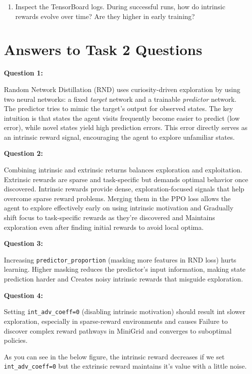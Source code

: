 \documentclass[12pt]{article}
\begin{document}
{{{\begin{itemize}[noitemsep]
\begin{enumerate}
    \item Inspect the TensorBoard logs. During successful runs, how do intrinsic rewards evolve over time? Are they higher in early training?
\end{enumerate}
\end{itemize}

\section*{Answers to Task 2 Questions}

\textbf{Question 1:} 

Random Network Distillation (RND) uses curiosity-driven exploration by using two neural networks: a fixed \textit{target} network and a trainable \textit{predictor} network. The predictor tries to mimic the target's output for observed states. The key intuition is that states the agent visits frequently become easier to predict (low error), while novel states yield high prediction errors. This error directly serves as an intrinsic reward signal, encouraging the agent to explore unfamiliar states.

\textbf{Question 2:} 

Combining intrinsic and extrinsic returns balances exploration and exploitation. Extrinsic rewards are sparse and task-specific but demands optimal behavior once discovered. Intrinsic rewards provide dense, exploration-focused signals that help overcome sparse reward problems. Merging them in the PPO loss allows the agent to explore effectively early on using intrinsic motivation and Gradually shift focus to task-specific rewards as they're discovered and Maintains exploration even after finding initial rewards to avoid local optima.

\textbf{Question 3:} 

Increasing \texttt{predictor\_proportion} (masking more features in RND loss) hurts learning. Higher masking reduces the predictor's input information, making state prediction harder and Creates noisy intrinsic rewards that misguide exploration.

\textbf{Question 4:} 

Setting \texttt{int\_adv\_coeff=0} (disabling intrinsic motivation) should result int slower exploration, especially in sparse-reward environments and causes Failure to discover complex reward pathways in MiniGrid and converges to suboptimal policies.

As you can see in the below figure, the intrinsic reward decreases if we set \texttt{int\_adv\_coeff=0} but the extrinsic reward maintains it's value with a little noise.

}}}
\end{document}
